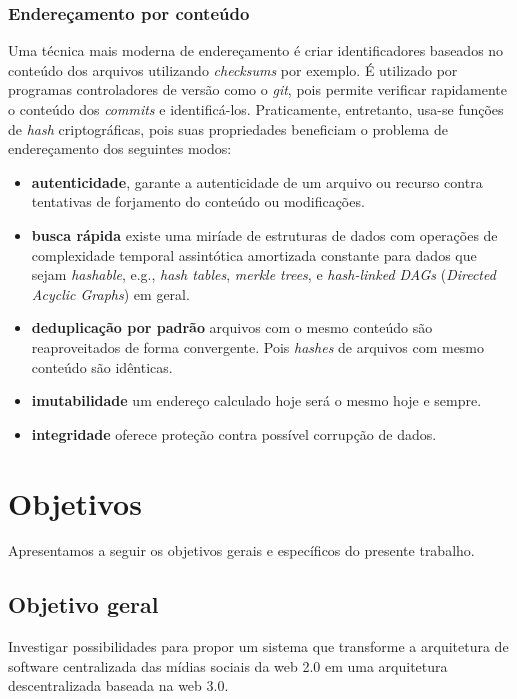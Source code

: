 \subsection{Endereçamento por conteúdo}

Uma técnica mais moderna de endereçamento é criar identificadores baseados no conteúdo dos arquivos utilizando \textit{checksums} por exemplo.
É utilizado por programas controladores de versão como o \textit{git}, pois permite verificar rapidamente o conteúdo dos \textit{commits} e identificá-los.
Praticamente, entretanto, usa-se funções de \textit{hash} criptográficas, pois suas propriedades beneficiam o problema de endereçamento dos seguintes modos:

\begin{itemize}
    \item \textbf{autenticidade}, garante a autenticidade de um arquivo ou recurso contra tentativas de forjamento do conteúdo ou modificações.
    \item \textbf{busca rápida} existe uma miríade de estruturas de dados com operações de complexidade temporal assintótica amortizada constante para dados que sejam \textit{hashable}, e.g., \textit{hash tables}, \textit{merkle trees}, e \textit{hash-linked DAGs} (\textit{Directed Acyclic Graphs}) em geral.
    \item \textbf{deduplicação por padrão} arquivos com o mesmo conteúdo são reaproveitados de forma convergente.
          Pois \textit{hashes} de arquivos com mesmo conteúdo são idênticas.
    \item \textbf{imutabilidade} um endereço calculado hoje será o mesmo hoje e sempre.
    \item \textbf{integridade} oferece proteção contra possível corrupção de dados.
\end{itemize}

\chapter{Objetivos}

Apresentamos a seguir os objetivos gerais e específicos do presente trabalho.

\section{Objetivo geral}

Investigar possibilidades para propor um sistema que transforme a arquitetura de software centralizada das mídias sociais da web 2.0 em uma arquitetura descentralizada baseada na web 3.0.

